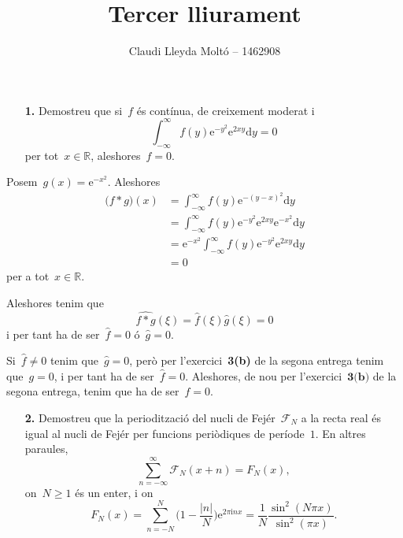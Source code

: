 \documentclass[a4paper]{article}
\title{Tercer lliurament}
\author{Claudi Lleyda Moltó -- 1462908}
\theoremstyle{plain}
\newcommand{\iu}{\mathrm{i}}
\newcommand{\e}{\mathrm{e}}
\providecommand{\uppi}{\pi}
\newcommand{\diff}{\mathrm{d}}
\newcommand{\abs}[1]{\lvert{#1}\rvert}
\newcommand{\F}{\mathcal{F}}
\begin{document}
\maketitle

\begin{enumerate}
    \item[\textbf{1.}] Demostreu que si~\(f\) és contínua, de creixement moderat
        i
        \[
            \int_{-\infty}^{\infty}f(y)\e^{-y^{2}}\e^{2xy}\diff y=0
        \]
        per tot~\(x\in\mathbb{R}\), aleshores~\(f=0\).
\end{enumerate}

Posem~\(g(x) = \e^{-x^{2}}\). Aleshores
\begin{align*}
    \bigl(f\ast g\bigr)(x)
        &= \int_{-\infty}^{\infty} f(y)\e^{-(y-x)^{2}} \diff y \\
        &= \int_{-\infty}^{\infty} f(y)\e^{-y^{2}}\e^{2xy}\e^{-x^{2}} \diff y \\
        &= \e^{-x^{2}}\int_{-\infty}^{\infty} f(y)\e^{-y^{2}}\e^{2xy} \diff y \\
        &= 0
\end{align*}
per a tot~\(x\in\mathbb{R}\).

Aleshores tenim que
\[
    \widehat{f\ast g}(\xi) = \widehat{f}(\xi)\widehat{g}(\xi) = 0
\]
i per tant ha de ser~\(\widehat{f} = 0\) \'o~\(\widehat{g} = 0\).

Si~\(\widehat{f}\neq0\) tenim que~\(\widehat{g} = 0\), però per
l'exercici~\textbf{3(b)} de la segona entrega tenim que~\(g=0\), i per tant ha
de ser~\(\widehat{f}=0\). Aleshores, de nou per l'exercici~\(\textbf{3(b)}\) de
la segona entrega, tenim que ha de ser~\(f=0\).

\clearpage

\begin{enumerate}
    \item[\textbf{2.}] Demostreu que la periodització del nucli de
        Fejér~\(\F_{N}\) a la recta real és igual al nucli de Fejér per funcions
        periòdiques de període~\(1\).
        En altres paraules,
        \[
            \sum_{n=-\infty}^{\infty} \F_{N}(x+n)
            = F_{N}(x),
        \]
        on~\(N\geq1\) és un enter, i on
        \[
            F_{N}(x) = \sum_{n=-N}^{N} \biggl(1 - \frac{\abs{n}}{N}\biggr)
            \e^{2\uppi\iu nx}
            = \frac{1}{N}\frac{\sin^{2}(N\uppi x)}{\sin^{2}(\uppi x)}.
        \]
\end{enumerate}
\end{document}

